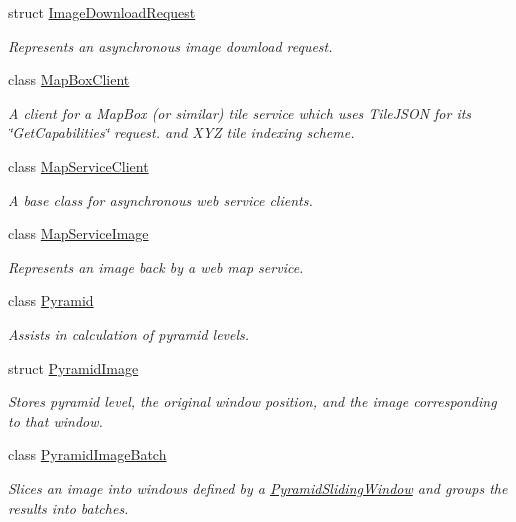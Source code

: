 \begin{DoxyCompactItemize}
struct \hyperlink{structdg_1_1deepcore_1_1imagery_1_1_image_download_request}{Image\+Download\+Request}
\begin{DoxyCompactList}\small\item\em Represents an asynchronous image download request. \end{DoxyCompactList}\item 
class \hyperlink{classdg_1_1deepcore_1_1imagery_1_1_map_box_client}{Map\+Box\+Client}
\begin{DoxyCompactList}\small\item\em A client for a Map\+Box (or similar) tile service which uses Tile\+J\+S\+ON for its \char`\"{}\+Get\+Capabilities\char`\"{} request. and X\+YZ tile indexing scheme. \end{DoxyCompactList}\item 
class \hyperlink{classdg_1_1deepcore_1_1imagery_1_1_map_service_client}{Map\+Service\+Client}
\begin{DoxyCompactList}\small\item\em A base class for asynchronous web service clients. \end{DoxyCompactList}\item 
class \hyperlink{classdg_1_1deepcore_1_1imagery_1_1_map_service_image}{Map\+Service\+Image}
\begin{DoxyCompactList}\small\item\em Represents an image back by a web map service. \end{DoxyCompactList}\item 
class \hyperlink{classdg_1_1deepcore_1_1imagery_1_1_pyramid}{Pyramid}
\begin{DoxyCompactList}\small\item\em Assists in calculation of pyramid levels. \end{DoxyCompactList}\item 
struct \hyperlink{structdg_1_1deepcore_1_1imagery_1_1_pyramid_image}{Pyramid\+Image}
\begin{DoxyCompactList}\small\item\em Stores pyramid level, the original window position, and the image corresponding to that window. \end{DoxyCompactList}\item 
class \hyperlink{classdg_1_1deepcore_1_1imagery_1_1_pyramid_image_batch}{Pyramid\+Image\+Batch}
\begin{DoxyCompactList}\small\item\em Slices an image into windows defined by a \hyperlink{classdg_1_1deepcore_1_1imagery_1_1_pyramid_sliding_window}{Pyramid\+Sliding\+Window} and groups the results into batches. \end{DoxyCompactList}\item 

\end{DoxyCompactItemize}
